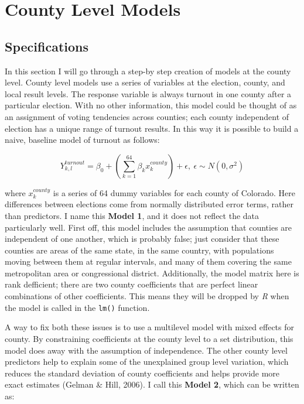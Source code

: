 \documentclass[12pt,twoside]{reedthesis}
\begin{document}
  \section{County Level Models}\label{county-level-models}
  
  \subsection{Specifications}\label{specifications}
  
  In this section I will go through a step-by step creation of models at
  the county level. County level models use a series of variables at the
  election, county, and local result levels. The response variable is
  always turnout in one county after a particular election. With no other
  information, this model could be thought of as an assignment of voting
  tendencies across counties; each county independent of election has a
  unique range of turnout results. In this way it is possible to build a
  naive, baseline model of turnout as follows:
  
  \begin{equation} \tag{Model 1}
  Y^{turnout}_{k,l} = \beta_0 + (\sum_{k=1}^{64}\beta_kx_k^{county}) + \epsilon,\ \epsilon \sim N(0,\sigma^2)
  \end{equation}
  
  where \(x_k^{county}\) is a series of 64 dummy variables for each county
  of Colorado. Here differences between elections come from normally
  distributed error terms, rather than predictors. I name this
  \textbf{Model 1}, and it does not reflect the data particularly well.
  First off, this model includes the assumption that counties are
  independent of one another, which is probably false; just consider that
  these counties are areas of the same state, in the same country, with
  populations moving between them at regular intervals, and many of them
  covering the same metropolitan area or congressional district.
  Additionally, the model matrix here is rank defficient; there are two
  county coefficients that are perfect linear combinations of other
  coefficients. This means they will be dropped by \textit{R} when the
  model is called in the \texttt{lm()} function.
  
  A way to fix both these issues is to use a multilevel model with mixed
  effects for county. By constraining coefficients at the county level to
  a set distribution, this model does away with the assumption of
  independence. The other county level predictors help to explain some of
  the unexplained group level variation, which reduces the standard
  deviation of county coefficients and helps provide more exact estimates
  (Gelman \& Hill, 2006). I call this \textbf{Model 2}, which can be
  written as:
  
\end{document}
